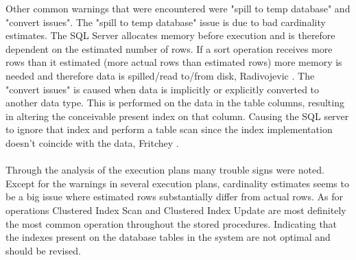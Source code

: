 \documentclass{cslthse-msc}
\begin{document}
Other common warnings that were encountered were "spill to temp database" and "convert issues". The "spill to temp database" issue is due to bad cardinality estimates. The SQL Server allocates memory before execution and is therefore dependent on the estimated number of rows. If a sort operation receives more rows than it estimated (more actual rows than estimated rows) more memory is needed and therefore data is spilled/read to/from disk, Radivojevic \cite{sortissues}. The "convert issues" is caused when data is implicitly or explicitly converted to another data type. This is performed on the data in the table columns, resulting in altering the conceivable present index on that column. Causing the SQL server to ignore that index and perform a table scan since the index implementation doesn't coincide with the data, Fritchey \cite{convertissues}.\\\\
Through the analysis of the execution plans many trouble signs were noted. Except for the warnings in several execution plans, cardinality estimates seems to be a big issue where estimated rows substantially differ from actual rows. As for operations Clustered Index Scan and Clustered Index Update are most definitely the most common operation throughout the stored procedures. Indicating that the indexes present on the database tables in the system are not optimal and should be revised.    

\newpage
\end{document}
